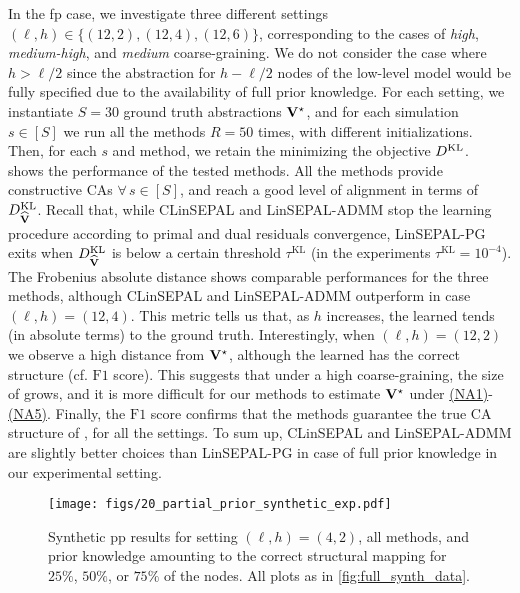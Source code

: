 In the fp case, we investigate three different settings $(\ell,h)\in \{(12,2), (12,4), (12,6)\}$, corresponding to the cases of \emph{high}, \emph{medium-high}, and \emph{medium} coarse-graining.
We do not consider the case where $h>\ell/2$ since the abstraction for $h-\ell/2$ nodes of the low-level model would be fully specified due to the availability of full prior knowledge.
For each setting, we instantiate $S=30$ ground truth abstractions $\mathbf{V}^\star$, and for each simulation $s \in [S]$ we run all the methods $R=50$ times, with different initializations.
Then, for each $s$ and method, we retain the \Vhat minimizing the objective $D^{\mathrm{KL}}_{}$.\\
 shows the performance of the tested methods. 
All the methods provide constructive CAs $\forall \, s \in [S]$, and reach a good level of alignment in terms of $D^{\mathrm{KL}}_{\widehat{\mathbf{V}}}$.
Recall that, while CLinSEPAL and LinSEPAL-ADMM stop the learning procedure according to primal and dual residuals convergence, LinSEPAL-PG exits when $D^{\mathrm{KL}}_{\widehat{\mathbf{V}}}$ is below a certain threshold $\tau^{\mathrm{KL}}$ (in the experiments $\tau^{\mathrm{KL}}=10^{-4}$). 
The Frobenius absolute distance shows comparable performances for the three methods, although CLinSEPAL and LinSEPAL-ADMM outperform in case $(\ell, h)=(12,4)$.
This metric tells us that, as $h$ increases, the learned \Vhat tends (in absolute terms) to the ground truth.
Interestingly, when $(\ell, h)=(12,2)$ we observe a high distance from $\mathbf{V}^\star$, although the learned \Vhat has the correct structure (cf. $\mathrm{F1}$ score).
This suggests that under a high coarse-graining, the size of \myker \KL{} grows, and it is more difficult for our methods to estimate $\mathbf{V}^\star$ under \hyperlink{(NA1)}{(NA1)}-\hyperlink{(NA5)}{(NA5)}.
Finally, the $\mathrm{F1}$ score confirms that the methods guarantee the true CA structure of \Vhat, for all the settings.
To sum up, CLinSEPAL and LinSEPAL-ADMM are slightly better choices than LinSEPAL-PG in case of full prior knowledge in our experimental setting.

\begin{figure}[t]
    \centering
    \texttt{[image: figs/20\_partial\_prior\_synthetic\_exp.pdf]}
    \caption{Synthetic pp results for setting $(\ell, h)=(4,2)$, all methods, and prior knowledge amounting to the correct structural mapping for $25\%$, $50\%$, or $75\%$ of the nodes. All plots as in \cref{fig:full_synth_data}.
    }
    \label{fig:partial_synth_data}
\end{figure}

